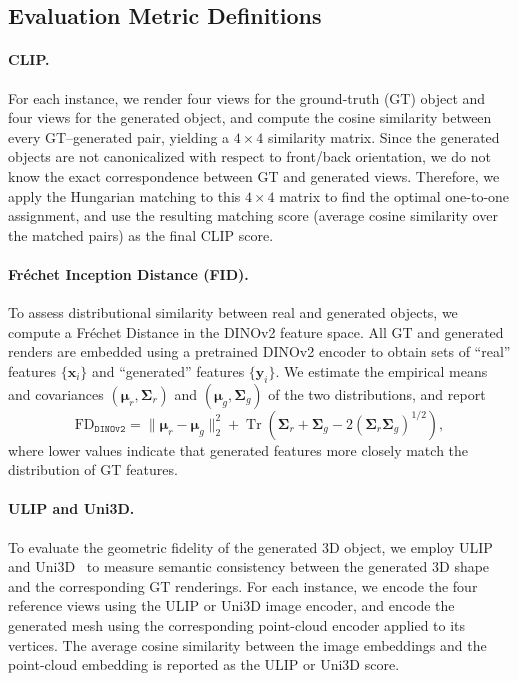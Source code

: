 \subsection{Evaluation Metric Definitions}

\paragraph{CLIP.}
For each instance, we render four views for the ground-truth (GT) object and four views for the generated object, and compute the cosine similarity between every GT–generated pair, yielding a $4 \times 4$ similarity matrix. 
Since the generated objects are not canonicalized with respect to front/back orientation, we do not know the exact correspondence between GT and generated views. 
Therefore, we apply the Hungarian matching to this $4 \times 4$ matrix to find the optimal one-to-one assignment, and use the resulting matching score (average cosine similarity over the matched pairs) as the final CLIP score.

\paragraph{Fréchet Inception Distance (FID).}
To assess distributional similarity between real and generated objects, we compute a Fréchet Distance in the DINOv2 feature space. 
All GT and generated renders are embedded using a pretrained DINOv2 encoder to obtain sets of ``real'' features $\{\mathbf{x}_i\}$ and ``generated'' features $\{\mathbf{y}_i\}$. 
We estimate the empirical means and covariances $(\boldsymbol{\mu}_r, \boldsymbol{\Sigma}_r)$ and $(\boldsymbol{\mu}_g, \boldsymbol{\Sigma}_g)$ of the two distributions, and report
\begin{equation}
    \text{FD}_\texttt{DINOv2}
    = \|\boldsymbol{\mu}_r - \boldsymbol{\mu}_g\|_2^2
      + \operatorname{Tr}\!\left(\boldsymbol{\Sigma}_r + \boldsymbol{\Sigma}_g
      - 2(\boldsymbol{\Sigma}_r \boldsymbol{\Sigma}_g)^{1/2}\right),
\end{equation}
where lower values indicate that generated features more closely match the distribution of GT features.

\paragraph{ULIP and Uni3D.}
To evaluate the geometric fidelity of the generated 3D object, we employ ULIP~\cite{ulip} and Uni3D~\cite{uni3d} to measure semantic consistency between the generated 3D shape and the corresponding GT renderings. 
For each instance, we encode the four reference views using the ULIP or Uni3D image encoder, and encode the generated mesh using the corresponding point-cloud encoder applied to its vertices. 
The average cosine similarity between the image embeddings and the point-cloud embedding is reported as the ULIP or Uni3D score.

